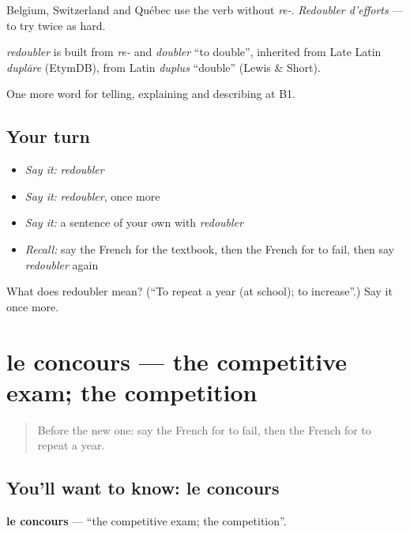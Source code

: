 Belgium, Switzerland and Québec use the verb without \emph{re-}. \emph{Redoubler d'efforts} — to try twice as hard.

\begin{cousinweb}
\emph{redoubler} is built from \emph{re-} and \emph{doubler} \textquotedblleft{}to double\textquotedblright{}, inherited from Late Latin \emph{duplāre} (EtymDB), from Latin \emph{duplus} \textquotedblleft{}double\textquotedblright{} (Lewis \& Short).
\end{cousinweb}

\begin{grammarlens}[title={What you've built}]
One more word for telling, explaining and describing at B1.
\end{grammarlens}

\subsection*{Your turn}
\begin{itemize}
\raggedright
  \item \emph{Say it:} \emph{redoubler}
  \item \emph{Say it:} \emph{redoubler}, once more
  \item \emph{Say it:} a sentence of your own with \emph{redoubler}
  \item \emph{Recall:} say the French for the textbook, then the French for to fail, then say \emph{redoubler} again
\end{itemize}

\begin{tcolorbox}[breakable,colback=teal!4,colframe=teal!35!black,title={Before you move on}]
What does redoubler mean? (\textquotedblleft{}To repeat a year (at school); to increase\textquotedblright{}.) Say it once more.
\end{tcolorbox}
\section[le concours]{le concours — the competitive exam; the competition}

\label{lesson:FR-C378-concours}



\begin{quote}
Before the new one: say the French for to fail, then the French for to repeat a year.
\end{quote}

\subsection*{You'll want to know: le concours}
\textbf{le concours} — \textquotedblleft{}the competitive exam; the competition\textquotedblright{}.

